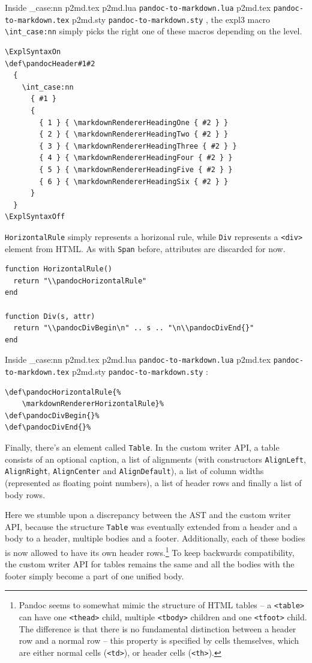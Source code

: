 \documentclass[
  digital,     %
  oneside,     %
  nosansbold,  %
  nocolorbold, %
  lof,         %
  nolot,       %
]{fithesis4}
\newcommand\macro[1]{\texttt{\textbackslash{}{#1}}}
\newcommand\file[1]
  {
    \str_case:nn
      { #1 }
      {
        { p2md.lua } { \texttt{pandoc\hyp{}to\hyp{}markdown.lua} }
        { p2md.tex } { \texttt{pandoc\hyp{}to\hyp{}markdown.tex} }
        { p2md.sty } { \texttt{pandoc\hyp{}to\hyp{}markdown.sty} }
      }
  }
\begin{document}
\noindent
Inside \file{p2md.tex}, the expl3 macro \macro{int\_case:nn} simply picks the right one of these macros depending on the level.

\noindent
\lstset{language=[plain]TeX}
\begin{lstlisting}
\ExplSyntaxOn
\def\pandocHeader#1#2
  {
    \int_case:nn
      { #1 }
      {
        { 1 } { \markdownRendererHeadingOne { #2 } }
        { 2 } { \markdownRendererHeadingTwo { #2 } }
        { 3 } { \markdownRendererHeadingThree { #2 } }
        { 4 } { \markdownRendererHeadingFour { #2 } }
        { 5 } { \markdownRendererHeadingFive { #2 } }
        { 6 } { \markdownRendererHeadingSix { #2 } }
      }
  }
\ExplSyntaxOff
\end{lstlisting}

\noindent
\texttt{HorizontalRule} simply represents a horizonal rule, while \texttt{Div} represents a \texttt{<div>} element from HTML. As with \texttt{Span} before, attributes are discarded for now.

\noindent
\lstset{language=[5.3]Lua}
\begin{lstlisting}
function HorizontalRule()
  return "\\pandocHorizontalRule"
end

function Div(s, attr)
  return "\\pandocDivBegin\n" .. s .. "\n\\pandocDivEnd{}"
end
\end{lstlisting}

\noindent
Inside \file{p2md.tex}:

\noindent
\lstset{language=[plain]TeX}
\begin{lstlisting}
\def\pandocHorizontalRule{%
    \markdownRendererHorizontalRule}%
\def\pandocDivBegin{}%
\def\pandocDivEnd{}%
\end{lstlisting}

\noindent
Finally, there's an element called \texttt{Table}. 
In the custom writer API, a table consists of an optional caption, a list of alignments (with constructors \texttt{AlignLeft}, \texttt{AlignRight}, \texttt{AlignCenter} and \texttt{AlignDefault}), a list of column widths (represented as floating point numbers), a list of header rows and finally a list of body rows.

Here we stumble upon a discrepancy between the AST and the custom writer API, because the structure \texttt{Table} was eventually extended from a header and a body to a header, multiple bodies and a footer. Additionally, each of these bodies is now allowed to have its own header rows.\footnote{Pandoc seems to somewhat mimic the structure of HTML tables -- a \texttt{<table>} can have one \texttt{<thead>} child, multiple \texttt{<tbody>} children and one \texttt{<tfoot>} child. The difference is that there is no fundamental distinction between a header row and a normal row -- this property is specified by cells themselves, which are either normal cells (\texttt{<td>}), or header cells (\texttt{<th>}).} To keep backwards compatibility, the custom writer API for tables remains the same and all the bodies with the footer simply become a part of one unified body.
\end{document}
